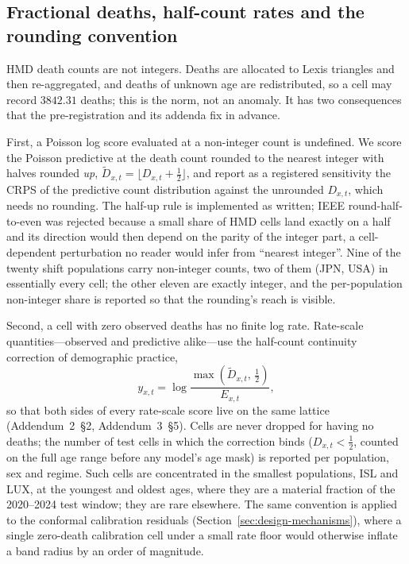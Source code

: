 \subsection{Fractional deaths, half-count rates and the rounding convention}
\label{sec:data-rounding}

HMD death counts are not integers. Deaths are allocated to Lexis triangles
and then re-aggregated, and deaths of unknown age are redistributed, so a
cell may record $3842.31$ deaths; this is the norm, not an anomaly. It has
two consequences that the pre-registration and its addenda fix in advance.

First, a Poisson log score evaluated at a non-integer count is undefined.
We score the Poisson predictive at the death count rounded to the nearest
integer with halves rounded \emph{up}, $\tilde D_{x,t} = \lfloor D_{x,t} +
\tfrac12 \rfloor$, and report as a registered sensitivity the CRPS of the
predictive count distribution against the unrounded $D_{x,t}$, which needs
no rounding. The half-up rule is implemented as written; IEEE
round-half-to-even was rejected because a small share of HMD cells land
exactly on a half and its direction would then depend on the parity of the
integer part, a cell-dependent perturbation no reader would infer from
``nearest integer''. Nine of the twenty shift populations carry
non-integer counts, two of them (JPN, USA) in essentially every cell; the
other eleven are exactly integer, and the per-population non-integer share
is reported so that the rounding's reach is visible.

Second, a cell with zero observed deaths has no finite log rate. Rate-scale
quantities---observed and predictive alike---use the half-count continuity
correction of demographic practice,
\begin{equation}
  y_{x,t} = \log\frac{\max(\tilde D_{x,t},\,\tfrac12)}{E_{x,t}},
  \label{eq:halfcount}
\end{equation}
so that both sides of every rate-scale score live on the same lattice
(Addendum~2~\S2, Addendum~3~\S5). Cells are never dropped for having no
deaths; the number of test cells in which the correction binds
($D_{x,t}<\tfrac12$, counted on the full age range before any model's age
mask) is reported per population, sex and regime. Such cells are
concentrated in the smallest populations, ISL and LUX, at the youngest and
oldest ages, where they are a material fraction of the 2020--2024 test
window; they are rare elsewhere. The same convention is applied to the
conformal calibration residuals (Section~\ref{sec:design-mechanisms}), where
a single zero-death calibration cell under a small rate floor would
otherwise inflate a band radius by an order of magnitude.


